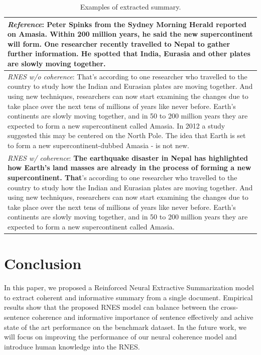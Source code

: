 \documentclass[letterpaper]{article} %
\begin{document}
    \vspace{-15pt}
	\begin{table}[ht]
		\centering
		\caption{Examples of extracted summary.}
		\label{tab:summary_examples}
		
		\begin{tabular}{|p{80mm}|}
			\hline
			\small{\textit{Reference}: Peter Spinks from the Sydney Morning Herald reported on Amasia. Within 200 million years, he said the new supercontinent will form. One researcher recently travelled to Nepal to gather further information. He spotted that India, Eurasia and other plates are slowly moving together.} \\\hline
			
			\small{\textit{RNES w/o coherence}: That's according to one researcher who travelled to the country to study how the Indian and Eurasian plates are moving together. And using new techniques, researchers can now start examining the changes due to take place over the next tens of millions of years like never before. Earth's continents are slowly moving together, and in 50 to 200 million years they are expected to form a new supercontinent called Amasia. In 2012 a study suggested this may be centered on the North Pole. The idea that Earth is set to form a new supercontinent-dubbed Amasia - is not new.}\\\hline

			\small{\textit{RNES w/ coherence}: \textbf{The earthquake disaster in Nepal has highlighted how Earth's land masses are already in the process of forming a new supercontinent. That}'s according to one researcher who travelled to the country to study how the Indian and Eurasian plates are moving together. And using new techniques, researchers can now start examining the changes due to take place over the next tens of millions of years like never before. Earth's continents are slowly moving together, and in 50 to 200 million years they are expected to form a new supercontinent called Amasia.} \\
			\hline
		\end{tabular}
	\end{table}
	\vspace{-15pt}

	\section{Conclusion}	
	In this paper, we proposed a Reinforced Neural Extractive Summarization model to extract coherent and informative summary from a single document. Empirical results show that the proposed RNES model can balance between the cross-sentence coherence and informative importance of sentence effectively and achive state of the art performance on the benchmark dataset. In the future work, we will focus on improving the performance of our neural coherence model and introduce human knowledge into the RNES.  
	
	\clearpage
	
	
	
\end{document}
